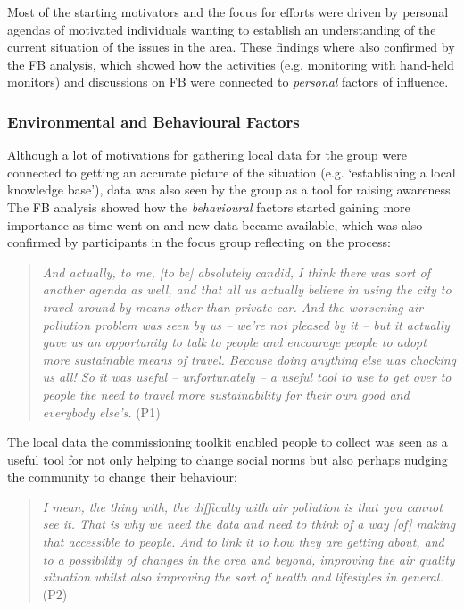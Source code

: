 Most of the starting motivators and the focus for efforts were driven by personal agendas of motivated individuals wanting to establish an understanding of the current situation of the issues in the area. These findings where also confirmed by the FB analysis, which showed how the activities (e.g. monitoring with hand-held monitors) and discussions on FB were connected to \textit{personal} factors of influence.

\subsubsection{Environmental and Behavioural Factors}
Although a lot of motivations for gathering local data for the group were connected to getting an accurate picture of the situation (e.g. `establishing a local knowledge base'), data was also seen by the group as a tool for raising awareness. The FB analysis showed how the \textit{behavioural} factors started gaining more importance as time went on and new data became available, which was also confirmed by participants in the focus group reflecting on the process:
\begin{quote}
    \textit{And actually, to me, [to be] absolutely candid, I think there was sort of another agenda as well, and that all us actually believe in using the city to travel around by means other than private car. And the worsening air pollution problem was seen by us -- we're not pleased by it -- but it actually gave us an opportunity to talk to people and encourage people to adopt more sustainable means of travel. Because doing anything else was chocking us all! So it was useful -- unfortunately -- a useful tool to use to get over to people the need to travel more sustainability for their own good and everybody else's.} (P1)
\end{quote}

The local data the commissioning toolkit enabled people to collect was seen as a useful tool for not only helping to change social norms but also perhaps nudging the community to change their behaviour:
\begin{quote}
    \textit{I mean, the thing with, the difficulty with air pollution is that you cannot see it. That is why we need the data and need to think of a way [of] making that accessible to people. And to link it to how they are getting about, and to a possibility of changes in the area and beyond, improving the air quality situation whilst also improving the sort of health and lifestyles in general.} (P2)
\end{quote}

